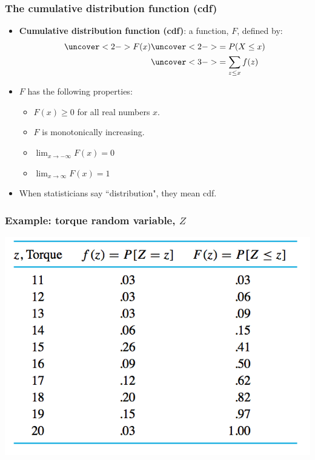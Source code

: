 \documentclass[handout]{beamer}\usepackage{graphicx, color}
\providecommand{\rt}{\rightarrow}
\numberwithin{equation}{section}
\begin{document}
\begin{frame}
\frametitle{The cumulative distribution function (cdf)}

\begin{itemize}
\item {\bf Cumulative distribution function (cdf)}: a function, $F$, defined by:
\begin{align*}
\uncover<2->{F(x)} &\uncover<2->{= P(X \le x)}\\
& \uncover<3->{= \sum_{z \le x} f(z)}
\end{align*}
\pause \pause  \pause \item $F$ has the following properties:
\begin{itemize}
\pause \item $F(x) \ge 0$ for all real numbers $x$.
\pause \item $F$ is monotonically increasing.
\pause \item $\lim_{x \rt -\infty} F(x) = 0$
\pause \item $\lim_{x \rt \infty} F(x) = 1$
\end{itemize}
\pause \item When statisticians say ``distribution", they mean cdf.
\end{itemize}
\end{frame}

\begin{frame}
\frametitle{Example: torque random variable, $Z$}
 \includegraphics{../../fig/torquep.png}
\end{frame}
\end{document}

